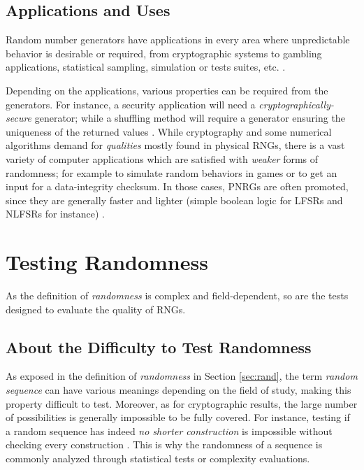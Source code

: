 \documentclass{llncs}
\begin{document}
\subsection{Applications and Uses}

Random number generators have applications in every area where unpredictable behavior is desirable or required, from cryptographic systems to gambling applications, statistical sampling, simulation or tests suites, etc. \cite{w-rng,ray:and}.

Depending on the applications, various properties can be required from the generators. For instance, a security application will need a \emph{cryptographically-secure} generator; while a shuffling method will require a generator ensuring the uniqueness of the returned values \cite{w-rng}. While cryptography and some numerical algorithms demand for \emph{qualities} mostly found in physical RNGs, there is a vast variety of computer applications which are satisfied with \emph{weaker} forms of randomness; for example to simulate random behaviors in games or to get an input for a data-integrity checksum. In those cases, PNRGs are often promoted, since they are generally faster and lighter (simple boolean logic for LFSRs and NLFSRs for instance) \cite{w-rng,ray:and}.

\section{Testing Randomness}
\label{sec:test}

As the definition of \emph{randomness} is complex and field-dependent, so are the tests designed to evaluate the quality of RNGs.
 
\subsection{About the Difficulty to Test Randomness}

As exposed in the definition of \textit{randomness} in Section \ref{sec:rand}, the term \textit{random sequence} can have various meanings depending on the field of study, making this property difficult to test. Moreover, as for cryptographic results, the large number of possibilities is generally impossible to be fully covered. For instance, testing if a random sequence has indeed \textit{no shorter construction} is impossible without checking every construction \cite{ritt}. 
This is why the randomness of a sequence is commonly analyzed through statistical tests or complexity evaluations.
\end{document}
